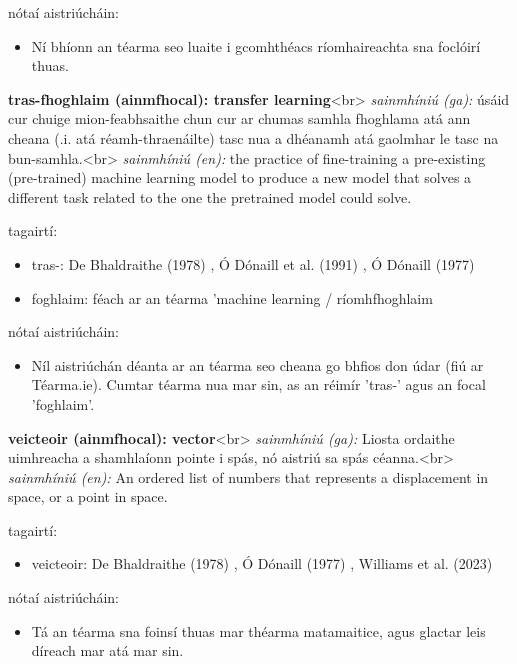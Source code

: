 \documentclass{article}
\begin{document}
nótaí aistriúcháin:
\begin{itemize}
	\item Ní bhíonn an téarma seo luaite i gcomhthéacs ríomhaireachta sna foclóirí thuas.
\end{itemize}


\textbf{tras-fhoghlaim (ainmfhocal): transfer learning}<br>
\textit{sainmhíniú (ga):} úsáid cur chuige mion-feabhsaithe chun cur ar chumas samhla fhoghlama atá ann cheana (.i. atá réamh-thraenáilte) tasc nua a dhéanamh atá gaolmhar le tasc na bun-samhla.<br>
\textit{sainmhíniú (en):} the practice of fine-training a pre-existing (pre-trained) machine learning model to produce a new model that solves a different task related to the one the pretrained model could solve.

tagairtí:
\begin{itemize}
	\item tras-: De Bhaldraithe (1978) \cite{de-bhaldraithe}, Ó Dónaill et al. (1991) \cite{focloir-beag}, Ó Dónaill (1977) \cite{odonaill}
	\item foghlaim: féach ar an téarma 'machine learning / ríomhfhoghlaim
\end{itemize}

nótaí aistriúcháin:
\begin{itemize}
	\item Níl aistriúchán déanta ar an téarma seo cheana go bhfios don údar (fiú ar Téarma.ie). Cumtar téarma nua mar sin, as an réimír 'tras-' agus an focal 'foghlaim'.
\end{itemize}


\textbf{veicteoir (ainmfhocal): vector}<br>
\textit{sainmhíniú (ga):} Liosta ordaithe uimhreacha a shamhlaíonn pointe i spás, nó aistriú sa spás céanna.<br>
\textit{sainmhíniú (en):} An ordered list of numbers that represents a displacement in space, or a point in space.

tagairtí:
\begin{itemize}
	\item veicteoir: De Bhaldraithe (1978) \cite{de-bhaldraithe}, Ó Dónaill (1977) \cite{odonaill}, Williams et al. (2023) \cite{storchiste}
\end{itemize}

nótaí aistriúcháin:
\begin{itemize}
	\item Tá an téarma sna foinsí thuas mar théarma matamaitice, agus glactar leis díreach mar atá mar sin.
\end{itemize}
\end{document}
